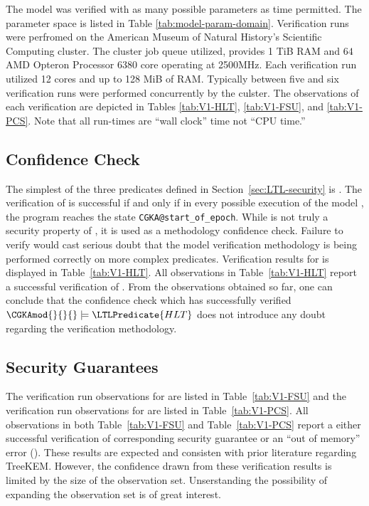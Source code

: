 The model  was verified with as many possible parameters as time permitted.
The parameter space is listed in  Table \ref{tab:model-param-domain}.
Verification runs were perfromed on the American Museum of Natural History's Scientific Computing cluster.
The cluster job queue utilized, provides 1 TiB RAM and \(64\) AMD Opteron Processor 6380 core operating at 2500MHz.
Each verification run utilized 12 cores and up to 128 MiB of RAM.
Typically between five and six verification runs were performed concurrently by the culster.
The observations of each  verification are depicted in Tables \ref{tab:V1-HLT}, \ref{tab:V1-FSU}, and \ref{tab:V1-PCS}.
Note that all run-times are ``wall clock'' time not ``CPU time.''

\hypertarget{sec:confidence-check}{%
\subsection{Confidence Check}\label{sec:confidence-check}}

The simplest of the three  predicates defined in Section\ \ref{sec:LTL-security} is .
The verification of  is successful if and only if in every possible execution of the model \CGKAmod{}{}{}, the program reaches the state \texttt{CGKA@start\_of\_epoch}.
While  is not truly a security property of \CGKAmod{}{}{}, it is used as a methodology confidence check.
Failure to verify  would cast serious doubt that the model verification methodology is being performed correctly on more complex  predicates.
Verification results for  is displayed in Table\ \ref{tab:V1-HLT}.
All observations in Table\ \ref{tab:V1-HLT} report a successful verification of .
From the observations obtained so far, one can conclude that the confidence check which has successfully verified \( \CGKAmod{}{}{} \models \LTLPredicate{HLT} \) does not introduce any doubt regarding the verification methodology.


\hypertarget{sec:post-compromise-security-results}{%
\subsection{Security Guarantees}\label{sec:post-compromise-security-results}}

The verification run observations for  are listed in Table\ \ref{tab:V1-FSU} and the verification run observations for  are listed in Table\ \ref{tab:V1-PCS}.
All observations in both Table\ \ref{tab:V1-FSU} and Table\ \ref{tab:V1-PCS} report a either successful verification of corresponding security guarantee or an ``out of memory'' error (\OutOfMemory).
These results are expected and consisten with prior literature regarding TreeKEM.
However, the confidence drawn from these verification results is limited by the size of the observation set.
Unserstanding the possibility of expanding the observation set is of great interest.



